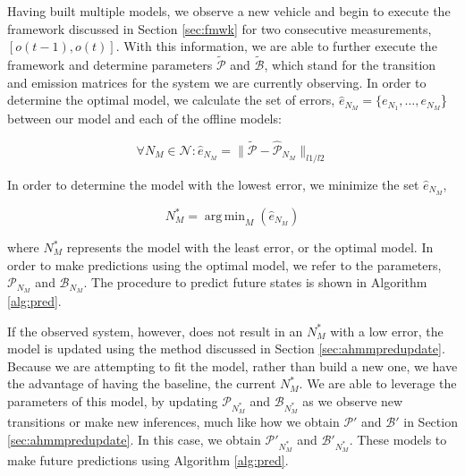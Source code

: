 \documentclass[letterpaper, 10 pt, conference]{ieeeconf}  %
\DeclareMathOperator*{\argmin}{arg\,min}
\newcommand\NB[1]{$\spadesuit$\footnote{NB: #1}}
\begin{document}
Having built multiple models, we observe a new vehicle and begin to execute the framework discussed in Section \ref{sec:fmwk} for two consecutive measurements, $\left[o(t-1),o(t)\right]$. With this information, we are able to further execute the framework and determine parameters $\tilde{\mathcal{P}}$ and $\tilde{\mathcal{B}}$, which stand for the transition and emission matrices for the system we are currently observing. In order to determine the optimal model, we calculate the set of errors, $\hat{e}_{N_{M}} = \{e_{N_1},\ldots,e_{N_M}$\} between our model and each of the offline models:

\begin{equation}
    \forall{N_M} \in \mathcal{N}: \hat{e}_{N_M} = \lVert\tilde{\mathcal{P}}-\hat{\mathcal{P}}_{N_M}\rVert_{l1/l2}
\end{equation}

In order to determine the model with the lowest error, we minimize the set $\hat{e}_{N_M}$,

\begin{equation}
    N_M^* = \argmin_{M}(\hat{e}_{N_M})
\end{equation}

where $N_M^*$ represents the model with the least error, or the optimal model. In order to make predictions using the optimal model, we refer to the parameters, $\mathcal{P}_{N_M}$ and $\mathcal{B}_{N_M}$. The procedure to predict future states is shown in Algorithm \ref{alg:pred}.

If the observed system, however, does not result in an $N_M^*$ with a low error, the model is updated using the method discussed in Section \ref{sec:ahmmpredupdate}. Because we are attempting to fit the model, rather than build a new one, we have the advantage of having the baseline, the current $N_M^*$. We are able to leverage the parameters of this model, by  updating $\mathcal{P}_{N_M^*}$ and $\mathcal{B}_{N_M^*}$ as we observe new transitions or make new inferences, much like how we obtain $\mathcal{P}'$ and $\mathcal{B}'$ in Section \ref{sec:ahmmpredupdate}. In this case, we obtain $\mathcal{P}'_{N_M^*}$ and $\mathcal{B}'_{N_M^*}$. These models to make future predictions using Algorithm \ref{alg:pred}.
\end{document}
